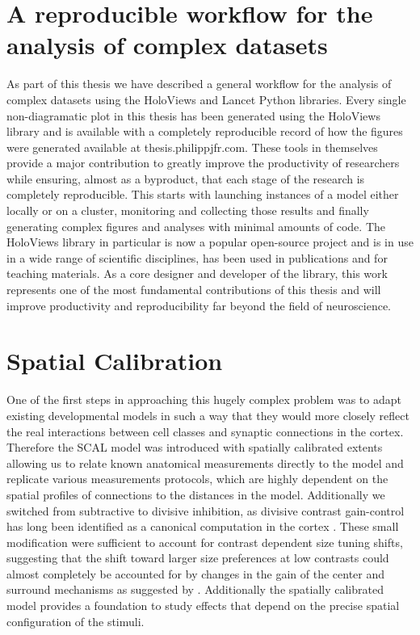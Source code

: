 \section{A reproducible workflow for the analysis of complex datasets}

As part of this thesis we have described a general workflow for the
analysis of complex datasets using the HoloViews and Lancet Python
libraries. Every single non-diagramatic plot in this thesis has been
generated using the HoloViews library and is available with a
completely reproducible record of how the figures were generated
available at thesis.philippjfr.com. These tools in themselves provide
a major contribution to greatly improve the productivity of
researchers while ensuring, almost as a byproduct, that each stage of
the research is completely reproducible. This starts with launching
instances of a model either locally or on a cluster, monitoring and
collecting those results and finally generating complex figures and
analyses with minimal amounts of code. The HoloViews library in
particular is now a popular open-source project and is in use in a
wide range of scientific disciplines, has been used in publications
and for teaching materials. As a core designer and developer of the
library, this work represents one of the most fundamental
contributions of this thesis and will improve productivity and
reproducibility far beyond the field of neuroscience.

\section{Spatial Calibration}

One of the first steps in approaching this hugely complex problem was
to adapt existing developmental models in such a way that they would
more closely reflect the real interactions between cell classes and
synaptic connections in the cortex. Therefore the SCAL model was
introduced with spatially calibrated extents allowing us to relate
known anatomical measurements directly to the model and replicate
various measurements protocols, which are highly dependent on the
spatial profiles of connections to the distances in the
model. Additionally we switched from subtractive to divisive
inhibition, as divisive contrast gain-control has long been identified
as a canonical computation in the cortex \citep{Carandini2012}. These
small modification were sufficient to account for contrast dependent
size tuning shifts, suggesting that the shift toward larger size
preferences at low contrasts could almost completely be accounted for
by changes in the gain of the center and surround mechanisms as
suggested by \cite{Cavanaugh2002}. Additionally the spatially
calibrated model provides a foundation to study effects that depend on
the precise spatial configuration of the stimuli.

